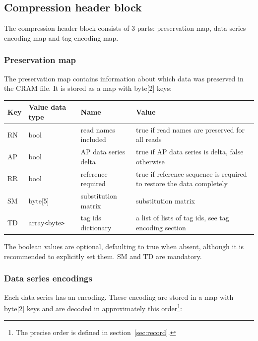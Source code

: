 \documentclass[a4paper]{article}
\begin{document}
\subsection{\textbf{Compression header block}}
\label{subsec:compression-header}

The compression header block consists of 3 parts: preservation map, data series 
encoding map and tag encoding map.

\subsubsection*{Preservation map}

The preservation map contains information about which data was preserved in the 
CRAM file. It is stored as a map with byte[2] keys:

\begin{tabular}{|l|l|>{\raggedright}p{100pt}|>{\raggedright}p{220pt}|}
\hline
\textbf{Key} & \textbf{Value data type} & \textbf{Name} & \textbf{Value}\tabularnewline
\hline
RN & bool & read names included & true if read names are preserved for all reads\tabularnewline
\hline
AP & bool & AP data series delta & true if AP data series is delta, false otherwise\tabularnewline
\hline
RR & bool & reference required & true if reference sequence is required to restore 
the data completely\tabularnewline
\hline
SM & byte[5] & substitution matrix & substitution matrix\tabularnewline
\hline
TD & array\texttt{<}byte\texttt{>} & tag ids dictionary & a list of lists of tag ids, see tag encoding section\tabularnewline
\hline
\end{tabular}

The boolean values are optional, defaulting to true when absent, although it is recommended to explicitly set them.  SM and TD are mandatory.

\subsubsection*{Data series encodings}

Each data series has an encoding. These encoding are stored in a map with byte[2] 
keys and are decoded in approximately this order\footnote{The precise order is defined in section~\ref{sec:record}.}:
\end{document}

